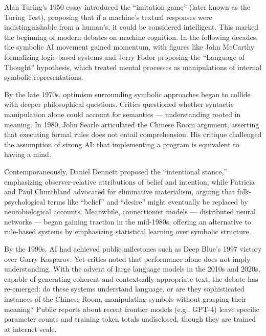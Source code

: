 \begin{historical}
Alan Turing’s 1950 essay introduced the “imitation game” (later known as the Turing Test), proposing that if a machine’s textual responses were indistinguishable from a human’s, it could be considered intelligent. This marked the beginning of modern debates on machine cognition. In the following decades, the symbolic AI movement gained momentum, with figures like John McCarthy formalizing logic-based systems and Jerry Fodor proposing the “Language of Thought” hypothesis, which treated mental processes as manipulations of internal symbolic representations.

By the late 1970s, optimism surrounding symbolic approaches began to collide with deeper philosophical questions. Critics questioned whether syntactic manipulation alone could account for semantics — understanding rooted in meaning. In 1980, John Searle articulated the Chinese Room argument, asserting that executing formal rules does not entail comprehension. His critique challenged the assumption of strong AI: that implementing a program is equivalent to having a mind.

Contemporaneously, Daniel Dennett proposed the “intentional stance,” emphasizing observer-relative attributions of belief and intention, while Patricia and Paul Churchland advocated for eliminative materialism, arguing that folk-psychological terms like “belief” and “desire” might eventually be replaced by neurobiological accounts. Meanwhile, connectionist models — distributed neural networks — began gaining traction in the mid-1980s, offering an alternative to rule-based systems by emphasizing statistical learning over symbolic structure.

By the 1990s, AI had achieved public milestones such as Deep Blue’s 1997 victory over Garry Kasparov. Yet critics noted that performance alone does not imply understanding. With the advent of large language models in the 2010s and 2020s, capable of generating coherent and contextually appropriate text, the debate has re-emerged: do these systems understand language, or are they sophisticated instances of the Chinese Room, manipulating symbols without grasping their meaning? Public reports about recent frontier models (e.g., GPT-4) leave specific parameter counts and training token totals undisclosed, though they are trained at internet scale.
\end{historical}
